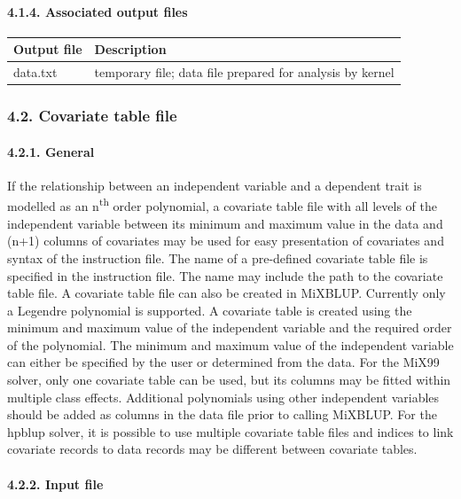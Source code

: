 \paragraph{4.1.4. Associated output files}\label{Obse06}

{\def\LTcaptype{none} %
\begin{longtable}[]{@{}ll@{}}
\toprule\noalign{}
Output file & Description \\
\midrule\noalign{}
\endhead
\bottomrule\noalign{}
\endlastfoot
data.txt & temporary file; data file prepared for analysis by kernel \\
\end{longtable}
}

\subsubsection{4.2. Covariate table file}\label{Obse07}

\paragraph{4.2.1. General}\label{Obse08}

If the relationship between an independent variable and a dependent
trait is modelled as an n\textsuperscript{th} order polynomial, a
covariate table file with all levels of the independent variable between
its minimum and maximum value in the data and (n+1) columns of
covariates may be used for easy presentation of covariates and syntax of
the instruction file. The name of a pre-defined covariate table file is
specified in the instruction file. The name may include the path to the
covariate table file. A covariate table file can also be created in
MiXBLUP. Currently only a Legendre polynomial is supported. A covariate
table is created using the minimum and maximum value of the independent
variable and the required order of the polynomial. The minimum and
maximum value of the independent variable can either be specified by the
user or determined from the data. For the MiX99 solver, only one
covariate table can be used, but its columns may be fitted within
multiple class effects. Additional polynomials using other independent
variables should be added as columns in the data file prior to calling
MiXBLUP. For the hpblup solver, it is possible to use multiple covariate
table files and indices to link covariate records to data records may be
different between covariate tables.

\paragraph{4.2.2. Input file}\label{Obse09}

